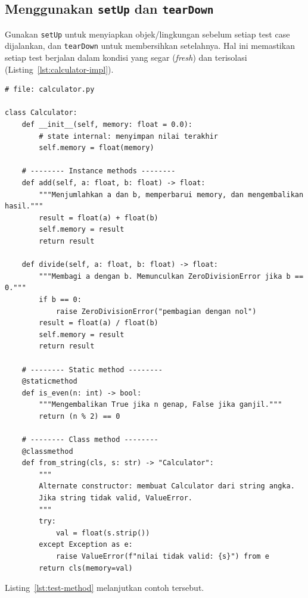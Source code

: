 \subsection{Menggunakan \texttt{setUp} dan \texttt{tearDown}}

Gunakan \texttt{setUp} untuk menyiapkan objek/lingkungan sebelum setiap test case dijalankan, dan \texttt{tearDown} untuk membersihkan setelahnya.  
Hal ini memastikan setiap test berjalan dalam kondisi yang segar (\emph{fresh}) dan terisolasi (Listing~\ref{lst:calculator-impl}).

\begin{lstlisting}[style=PythonStyle, caption={Kode kelas contoh untuk diuji}, label={lst:calculator-impl}]
# file: calculator.py

class Calculator:
    def __init__(self, memory: float = 0.0):
        # state internal: menyimpan nilai terakhir
        self.memory = float(memory)

    # -------- Instance methods --------
    def add(self, a: float, b: float) -> float:
        """Menjumlahkan a dan b, memperbarui memory, dan mengembalikan hasil."""
        result = float(a) + float(b)
        self.memory = result
        return result

    def divide(self, a: float, b: float) -> float:
        """Membagi a dengan b. Memunculkan ZeroDivisionError jika b == 0."""
        if b == 0:
            raise ZeroDivisionError("pembagian dengan nol")
        result = float(a) / float(b)
        self.memory = result
        return result

    # -------- Static method --------
    @staticmethod
    def is_even(n: int) -> bool:
        """Mengembalikan True jika n genap, False jika ganjil."""
        return (n % 2) == 0

    # -------- Class method --------
    @classmethod
    def from_string(cls, s: str) -> "Calculator":
        """
        Alternate constructor: membuat Calculator dari string angka.
        Jika string tidak valid, ValueError.
        """
        try:
            val = float(s.strip())
        except Exception as e:
            raise ValueError(f"nilai tidak valid: {s}") from e
        return cls(memory=val)
\end{lstlisting}

Listing~\ref{lst:test-method} melanjutkan contoh tersebut.

